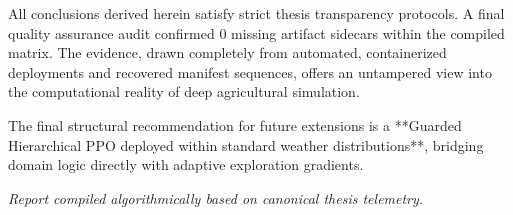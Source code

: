All conclusions derived herein satisfy strict thesis transparency protocols. A final quality assurance audit confirmed 0 missing artifact sidecars within the compiled matrix. The evidence, drawn completely from automated, containerized deployments and recovered manifest sequences, offers an untampered view into the computational reality of deep agricultural simulation.

The final structural recommendation for future extensions is a **Guarded Hierarchical PPO deployed within standard weather distributions**, bridging domain logic directly with adaptive exploration gradients.

\vspace{10em}
\begin{center}
    \textit{Report compiled algorithmically based on canonical thesis telemetry.}
\end{center}
